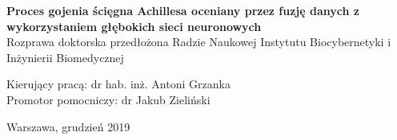 \begin{onehalfspacing}
\begin{center}
{\textbf 
{Proces gojenia ścięgna Achillesa oceniany przez fuzję danych z wykorzystaniem głębokich sieci neuronowych} \\[2.3cm]
\large
{Rozprawa doktorska przedłożona Radzie Naukowej Instytutu Biocybernetyki i Inżynierii Biomedycznej \\[1.7cm]}}



\large
\begin{flushleft}
Kierujący pracą:  dr hab. inż. Antoni Grzanka \\
Promotor pomocniczy:  dr Jakub Zieliński \\
\end{flushleft}

\vspace{1cm}
Warszawa, grudzień 2019
\end{center}
\end{onehalfspacing}

\singlespacing
\newpage
\thispagestyle{empty}
\mbox{}


